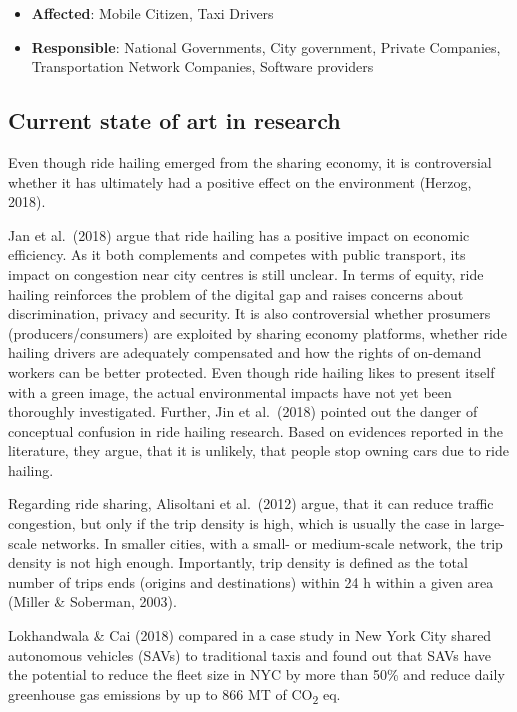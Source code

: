 \documentclass[
]{book}
\providecommand{\tightlist}{%
  \setlength{\itemsep}{0pt}\setlength{\parskip}{0pt}}
\begin{document}
\begin{itemize}
\tightlist
\item
  \textbf{Affected}: Mobile Citizen, Taxi Drivers
\item
  \textbf{Responsible}: National Governments, City government, Private Companies, Transportation Network Companies, Software providers
\end{itemize}

\hypertarget{current-state-of-art-in-research-45}{%
\subsection*{Current state of art in research}\label{current-state-of-art-in-research-45}}

Even though ride hailing emerged from the sharing economy, it is controversial whether it has ultimately had a positive effect on the environment (Herzog, 2018).

Jan et al.~(2018) argue that ride hailing has a positive impact on economic efficiency. As it both complements and competes with public transport, its impact on congestion near city centres is still unclear. In terms of equity, ride hailing reinforces the problem of the digital gap and raises concerns about discrimination, privacy and security. It is also controversial whether prosumers (producers/consumers) are exploited by sharing economy platforms, whether ride hailing drivers are adequately compensated and how the rights of on-demand workers can be better protected. Even though ride hailing likes to present itself with a green image, the actual environmental impacts have not yet been thoroughly investigated. Further, Jin et al.~(2018) pointed out the danger of conceptual confusion in ride hailing research. Based on evidences reported in the literature, they argue, that it is unlikely, that people stop owning cars due to ride hailing.

Regarding ride sharing, Alisoltani et al.~(2012) argue, that it can reduce traffic congestion, but only if the trip density is high, which is usually the case in large-scale networks. In smaller cities, with a small- or medium-scale network, the trip density is not high enough. Importantly, trip density is defined as the total number of trips ends (origins and destinations) within 24 h within a given area (Miller \& Soberman, 2003).

Lokhandwala \& Cai (2018) compared in a case study in New York City shared autonomous vehicles (SAVs) to traditional taxis and found out that SAVs have the potential to reduce the fleet size in NYC by more than 50\% and reduce daily greenhouse gas emissions by up to 866 MT of CO\textsubscript{2} eq.
\end{document}
